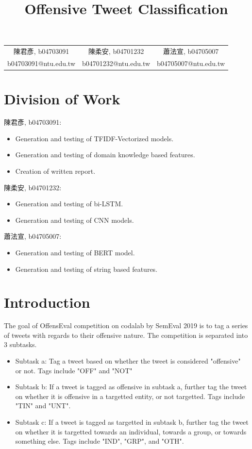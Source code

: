 \documentclass[a4paper, 12pt]{article}
\author{}
\title{\textbf{Offensive Tweet Classification}}
\begin{document}
    \maketitle     
    \begin{center}
        \begin{tabular}{ccc}
            陳君彥, b04703091 & 陳柔安, b04701232 & 蕭法宣, b04705007 \\
            b04703091@ntu.edu.tw &
            b04701232@ntu.edu.tw &
            b04705007@ntu.edu.tw
        \end{tabular}
    \end{center}

    \section*{Division of Work}
        陳君彥, b04703091: 
        \begin{itemize}
            \item Generation and testing of TFIDF-Vectorized models.
            \item Generation and testing of domain knowledge based features.
            \item Creation of written report.
        \end{itemize}
        陳柔安, b04701232:
        \begin{itemize}
            \item Generation and testing of bi-LSTM.
            \item Generation and testing of CNN models.
        \end{itemize}
        蕭法宣, b04705007:
        \begin{itemize}
            \item Generation and testing of BERT model.
            \item Generation and testing of string based features.
        \end{itemize}

    \section{Introduction}
        The goal of OffensEval competition on codalab by SemEval 2019 \cite{offens} is to tag a series of tweets with regards to their offensive nature. The competition is separated into 3 subtasks.
        \begin{itemize}
            \item Subtask a: Tag a tweet based on whether the tweet is considered "offensive" or not. Tags include "OFF" and "NOT"
            \item Subtask b: If a tweet is tagged as offensive in subtask a, further tag the tweet on whether it is offensive in a targetted entity, or not targetted. Tags include "TIN" and "UNT".
            \item Subtask c: If a tweet is tagged as targetted in subtask b, further tag the tweet on whether it is targetted towards an individual, towards a group, or towards something else. Tags include "IND", "GRP", and "OTH".
        \end{itemize}
\end{document}
